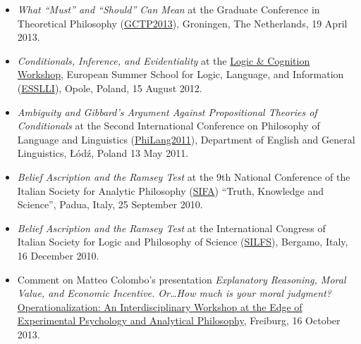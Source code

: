 \documentclass[a4paper,12pt]{article}
\begin{document}
\begin{small}
\begin{itemize}
    \item \emph{What ``Must'' and ``Should'' Can Mean} at the Graduate Conference in Theoretical Philosophy
    (\href{http://www.philos.rug.nl/GCTP2013/}{GCTP2013}), Groningen, The Netherlands, 19 April 2013. 
    
    \item \emph{Conditionals, Inference, and Evidentiality} at the \href{http://www.ai.rug.nl/SocialCognition/logic-cognition/}{Logic \& Cognition Workshop}, European Summer School for Logic, Language, and Information (\href{http://www.esslli2012.pl}{ESSLLI}), Opole, Poland, 15 August 2012. 

    \item \emph{Ambiguity and Gibbard's Argument Against Propositional Theories of Conditionals} at the Second International Conference on Philosophy of Language and Linguistics (\href{http://ia.uni.lodz.pl/linguistics/events/philang-2011}{PhiLang2011}),  Department of English and General Linguistics, Łódź, Poland
    13 May 2011. 

    \item \emph{Belief Ascription and the Ramsey Test} at the 9th National Conference of the Italian Society for Analytic Philosophy (\href{http://www.filosofia.lettere.unipd.it/analitica/sifa2010/}{SIFA}) ``Truth, Knowledge and Science'', Padua, Italy, 25 September 2010. 
  
    \item \emph{Belief Ascription and the Ramsey Test} at the International Congress of Italian Society for Logic and Philosophy of Science (\href{http://dinamico2.unibg.it/silfs/convegno2010.htm}{SILFS}), Bergamo, Italy, 16 December 2010. 
  \end{itemize}
  

  \begin{itemize}

  \item Comment on Matteo Colombo's presentation \emph{Explanatory Reasoning, Moral Value, and Economic Incentive. Or\ldots How much is your moral judgment?} 
    \href{http://www.psychologie.uni-freiburg.de/Members/singmann/operational2013}{Operationalization: An Interdisciplinary Workshop at the Edge of Experimental Psychology and Analytical Philosophy}, Freiburg, 16 October 2013.


\end{itemize}
\end{small}
\end{document}

